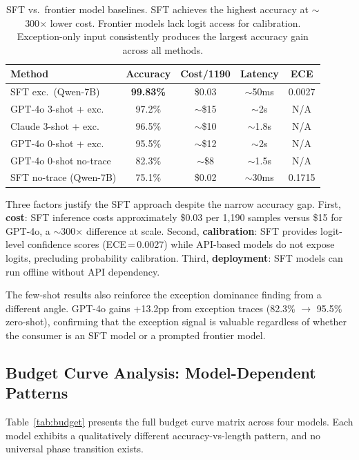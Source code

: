 \documentclass[11pt]{article}
\begin{document}
\begin{table}[t]
\centering
\caption{SFT vs.\ frontier model baselines. SFT achieves the highest accuracy at $\sim$300$\times$ lower cost. Frontier models lack logit access for calibration. Exception-only input consistently produces the largest accuracy gain across all methods.}
\label{tab:fewshot}
\small
\begin{tabular}{lcccc}
\toprule
\textbf{Method} & \textbf{Accuracy} & \textbf{Cost/1190} & \textbf{Latency} & \textbf{ECE} \\
\midrule
SFT exc.\ (Qwen-7B) & \textbf{99.83\%} & \$0.03 & $\sim$50ms & 0.0027 \\
GPT-4o 3-shot + exc. & 97.2\% & $\sim$\$15 & $\sim$2s & N/A \\
Claude 3-shot + exc. & 96.5\% & $\sim$\$10 & $\sim$1.8s & N/A \\
GPT-4o 0-shot + exc. & 95.5\% & $\sim$\$12 & $\sim$2s & N/A \\
GPT-4o 0-shot no-trace & 82.3\% & $\sim$\$8 & $\sim$1.5s & N/A \\
SFT no-trace (Qwen-7B) & 75.1\% & \$0.02 & $\sim$30ms & 0.1715 \\
\bottomrule
\end{tabular}
\end{table}

Three factors justify the SFT approach despite the narrow accuracy gap. First, \textbf{cost}: SFT inference costs approximately \$0.03 per 1{,}190 samples versus \$15 for GPT-4o, a $\sim$300$\times$ difference at scale. Second, \textbf{calibration}: SFT provides logit-level confidence scores (ECE\,=\,0.0027) while API-based models do not expose logits, precluding probability calibration. Third, \textbf{deployment}: SFT models can run offline without API dependency.

The few-shot results also reinforce the exception dominance finding from a different angle. GPT-4o gains +13.2pp from exception traces (82.3\% $\to$ 95.5\% zero-shot), confirming that the exception signal is valuable regardless of whether the consumer is an SFT model or a prompted frontier model.

\subsection{Budget Curve Analysis: Model-Dependent Patterns}
\label{sec:exp-budget}

Table~\ref{tab:budget} presents the full budget curve matrix across four models. Each model exhibits a qualitatively different accuracy-vs-length pattern, and no universal phase transition exists.
\end{document}

